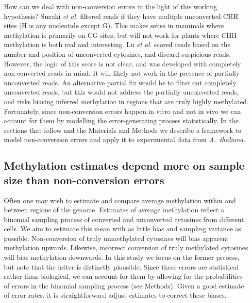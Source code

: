 \documentclass[10pt,letterpaper,draft]{article}
\begin{document}
How can we deal with non-conversion errors in the light of this working hypothesis?
Suzuki \textit{et al.}\cite{suzuki2018whole} filtered reads if they have multiple unconverted CHH sites (H is any nucleotide except G).
This makes sense in mammals where methylation is primarily on CG sites, but will not work for plants where CHH methylation is both real and interesting.
Lu \textit{et al.} \cite{lu2015improved} scored reads based on the number and position of unconverted cytosines, and discard suspicious reads.
However, the logic of this score is not clear, and was developed with completely non-converted reads in mind.
It will likely not work in the presence of partially unconverted reads.
An alternative partial fix would be to filter out completely unconverted reads, but this would not address the partially unconverted reads, and risks biasing inferred methylation in regions that are truly highly methylated.
Fortunately, since non-conversion errors happen in vitro and not in vivo we can account for them by modelling the error-generating process statistically.
In the sections that follow and the Materials and Methods we describe a framework to model non-conversion errors and apply it to experimental data from \emph{A.~thaliana}.

\subsection*{Methylation estimates depend more on sample size than non-conversion errors}

Often one may wish to estimate and compare average methylation within and between regions of the genome.
Estimates of average methylation reflect a binomial sampling process of converted and unconverted cytosines from different cells.
We aim to estimate this mean with as little bias and sampling variance as possible.
Non-conversion of truly unmethylated cytosines will bias apparent methylation upwards.
Likewise, incorrect conversion of truly methylated cytosines will bias methylation downwards.
In this study we focus on the former prcoess, but note that the latter is distinctly plausible.
Since these errors are statistical rather than biological, we can account for them by allowing for the probabilities of errors in the binomial sampling process (see Methods).
Given a good estimate of error rates, it is straightforward adjust estimates to correct these biases.
\end{document}
